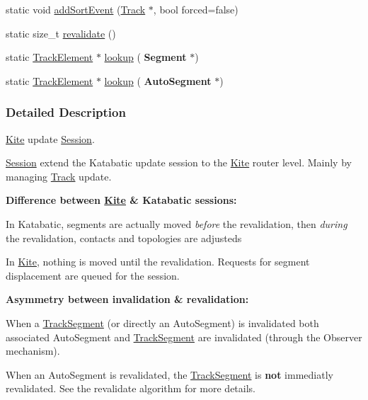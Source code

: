 \begin{DoxyCompactItemize}
\item 
static void \hyperlink{classKite_1_1Session_a990d32b1f1ea661b088a05f86319772f}{add\+Sort\+Event} (\hyperlink{classKite_1_1Track}{Track} $\ast$, bool forced=false)
\item 
static size\+\_\+t \hyperlink{classKite_1_1Session_a5bd93abe1416952ace15a98dbeeed124}{revalidate} ()
\item 
static \hyperlink{classKite_1_1TrackElement}{Track\+Element} $\ast$ \hyperlink{classKite_1_1Session_a1728621b96081c32fb7bfb18a0ebfad3}{lookup} (\textbf{ Segment} $\ast$)
\item 
static \hyperlink{classKite_1_1TrackElement}{Track\+Element} $\ast$ \hyperlink{classKite_1_1Session_a3946039ef19b5b6994171288f183bdaf}{lookup} (\textbf{ Auto\+Segment} $\ast$)
\end{DoxyCompactItemize}


\subsubsection{Detailed Description}
\hyperlink{namespaceKite}{Kite} update \hyperlink{classKite_1_1Session}{Session}. 

\hyperlink{classKite_1_1Session}{Session} extend the Katabatic update session to the \hyperlink{namespaceKite}{Kite} router level. Mainly by managing \hyperlink{classKite_1_1Track}{Track} update.

{\bfseries Difference between \hyperlink{namespaceKite}{Kite} \& Katabatic sessions\+:}
\begin{DoxyItemize}
\item In Katabatic, segments are actually moved {\itshape before} the revalidation, then {\itshape during} the revalidation, contacts and topologies are adjusteds
\item In \hyperlink{namespaceKite}{Kite}, nothing is moved until the revalidation. Requests for segment displacement are queued for the session.
\end{DoxyItemize}

{\bfseries Asymmetry between invalidation \& revalidation\+:}
\begin{DoxyItemize}
\item When a \hyperlink{classKite_1_1TrackSegment}{Track\+Segment} (or directly an Auto\+Segment) is invalidated both associated Auto\+Segment and \hyperlink{classKite_1_1TrackSegment}{Track\+Segment} are invalidated (through the Observer mechanism).
\item When an Auto\+Segment is revalidated, the \hyperlink{classKite_1_1TrackSegment}{Track\+Segment} is {\bfseries not} immediatly revalidated. See the revalidate algorithm for more details.
\end{DoxyItemize}


